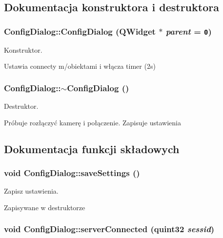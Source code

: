 \subsection{Dokumentacja konstruktora i destruktora}
\hypertarget{class_config_dialog_d16df8ed2e55bd5cc55e3ef9040b8b93}{
\subsubsection[{ConfigDialog}]{\setlength{\rightskip}{0pt plus 5cm}ConfigDialog::ConfigDialog (QWidget $\ast$ {\em parent} = {\tt 0})}}
\label{class_config_dialog_d16df8ed2e55bd5cc55e3ef9040b8b93}


Konstruktor. 

Ustawia connecty m/obiektami i włącza timer (2s) \hypertarget{class_config_dialog_485badac4dffa04603f800bb9d396e1d}{
\subsubsection[{$\sim$ConfigDialog}]{\setlength{\rightskip}{0pt plus 5cm}ConfigDialog::$\sim$ConfigDialog ()}}
\label{class_config_dialog_485badac4dffa04603f800bb9d396e1d}


Destruktor. 

Próbuje rozłączyć kamerę i połączenie. Zapisuje ustawienia 

\subsection{Dokumentacja funkcji składowych}
\hypertarget{class_config_dialog_dfe6884aef5e1c04ce574c6c9a1a97d9}{
\subsubsection[{saveSettings}]{\setlength{\rightskip}{0pt plus 5cm}void ConfigDialog::saveSettings ()}}
\label{class_config_dialog_dfe6884aef5e1c04ce574c6c9a1a97d9}


Zapisz ustawienia. 

Zapisywane w destruktorze \hypertarget{class_config_dialog_5611fa4c9de2827139161cd75a7f4be6}{
\subsubsection[{serverConnected}]{\setlength{\rightskip}{0pt plus 5cm}void ConfigDialog::serverConnected (quint32 {\em sessid})}}
\label{class_config_dialog_5611fa4c9de2827139161cd75a7f4be6}


